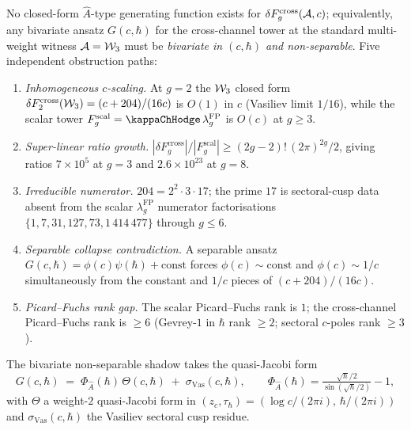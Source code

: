 \begin{proposition}
\label{prop:cross-channel-no-closed-form}
No closed-form $\hat A$-type generating function exists for
$\delta F_g^{\mathrm{cross}}(\mathcal{A}, c)$; equivalently, any bivariate
ansatz $G(c, \hbar)$ for the cross-channel tower at the standard
multi-weight witness $\mathcal{A} = \mathcal{W}_3$ must be \emph{bivariate in
$(c, \hbar)$ and non-separable}. Five independent obstruction paths:
\begin{enumerate}[label=\textup{(\roman*)}]
\item \emph{Inhomogeneous $c$-scaling.} At $g = 2$ the
$\mathcal{W}_3$ closed form
$\delta F_2^{\mathrm{cross}}(\mathcal{W}_3) = (c + 204)/(16 c)$
is $O(1)$ in $c$ \textup{(}Vasiliev limit $1/16$\textup{)}, while
the scalar tower $F_g^{\mathrm{scal}} = \kappaChHodge\,\lambda_g^{\mathrm{FP}}$
is $O(c)$ at $g \ge 3$.
\item \emph{Super-linear ratio growth.}
$|\delta F_g^{\mathrm{cross}}| / |F_g^{\mathrm{scal}}|
\ge (2g - 2)!\,(2\pi)^{2g} / 2$, giving ratios
$7 \times 10^5$ at $g = 3$ and $2.6 \times 10^{23}$ at $g = 8$.
\item \emph{Irreducible numerator.} $204 = 2^2 \cdot 3 \cdot 17$;
the prime $17$ is sectoral-cusp data absent from the scalar
$\lambda_g^{\mathrm{FP}}$ numerator factorisations
$\{1, 7, 31, 127, 73, 1\,414\,477\}$ through $g \le 6$.
\item \emph{Separable collapse contradiction.} A separable ansatz
$G(c, \hbar) = \phi(c) \psi(\hbar) + \mathrm{const}$ forces
$\phi(c) \sim \mathrm{const}$ and $\phi(c) \sim 1/c$ simultaneously
from the constant and $1/c$ pieces of $(c + 204)/(16 c)$.
\item \emph{Picard--Fuchs rank gap.} The scalar Picard--Fuchs rank
is $1$; the cross-channel Picard--Fuchs rank is $\ge 6$ (Gevrey-$1$
in $\hbar$ rank $\ge 2$; sectoral $c$-poles rank $\ge 3$).
\end{enumerate}
The bivariate non-separable shadow takes the quasi-Jacobi form
\[
 G(c, \hbar)
 \;=\;
 \Phi_{\hat A}(\hbar)\,\Theta(c, \hbar)
 \;+\;
 \sigma_{\mathrm{Vas}}(c, \hbar),
\qquad
 \Phi_{\hat A}(\hbar) = \tfrac{\sqrt\hbar/2}{\sin(\sqrt\hbar/2)} - 1,
\]
with $\Theta$ a weight-$2$ quasi-Jacobi form in
$(z_c, \tau_\hbar) = (\log c/(2\pi i),\, \hbar/(2\pi i))$ and
$\sigma_{\mathrm{Vas}}(c, \hbar)$ the Vasiliev sectoral cusp residue.
\end{proposition}

